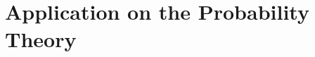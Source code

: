 \documentclass[pmath451]{subfiles}
\begin{document}
    \section{Application on the Probability Theory}
    
\end{document}
